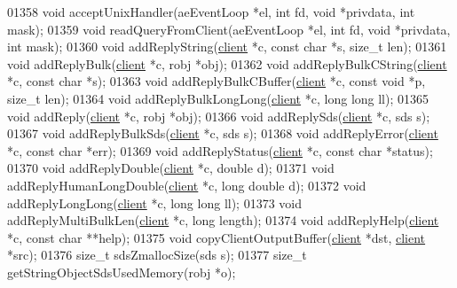 \begin{DoxyCode}
{{{{{{{01358 \textcolor{keywordtype}{void} acceptUnixHandler(aeEventLoop *el, \textcolor{keywordtype}{int} fd, \textcolor{keywordtype}{void} *privdata, \textcolor{keywordtype}{int} mask);
01359 \textcolor{keywordtype}{void} readQueryFromClient(aeEventLoop *el, \textcolor{keywordtype}{int} fd, \textcolor{keywordtype}{void} *privdata, \textcolor{keywordtype}{int} mask);
01360 \textcolor{keywordtype}{void} addReplyString(\hyperlink{structclient}{client} *c, \textcolor{keyword}{const} \textcolor{keywordtype}{char} *s, size\_t len);
01361 \textcolor{keywordtype}{void} addReplyBulk(\hyperlink{structclient}{client} *c, robj *obj);
01362 \textcolor{keywordtype}{void} addReplyBulkCString(\hyperlink{structclient}{client} *c, \textcolor{keyword}{const} \textcolor{keywordtype}{char} *s);
01363 \textcolor{keywordtype}{void} addReplyBulkCBuffer(\hyperlink{structclient}{client} *c, \textcolor{keyword}{const} \textcolor{keywordtype}{void} *p, size\_t len);
01364 \textcolor{keywordtype}{void} addReplyBulkLongLong(\hyperlink{structclient}{client} *c, \textcolor{keywordtype}{long} \textcolor{keywordtype}{long} ll);
01365 \textcolor{keywordtype}{void} addReply(\hyperlink{structclient}{client} *c, robj *obj);
01366 \textcolor{keywordtype}{void} addReplySds(\hyperlink{structclient}{client} *c, sds s);
01367 \textcolor{keywordtype}{void} addReplyBulkSds(\hyperlink{structclient}{client} *c, sds s);
01368 \textcolor{keywordtype}{void} addReplyError(\hyperlink{structclient}{client} *c, \textcolor{keyword}{const} \textcolor{keywordtype}{char} *err);
01369 \textcolor{keywordtype}{void} addReplyStatus(\hyperlink{structclient}{client} *c, \textcolor{keyword}{const} \textcolor{keywordtype}{char} *status);
01370 \textcolor{keywordtype}{void} addReplyDouble(\hyperlink{structclient}{client} *c, \textcolor{keywordtype}{double} d);
01371 \textcolor{keywordtype}{void} addReplyHumanLongDouble(\hyperlink{structclient}{client} *c, \textcolor{keywordtype}{long} \textcolor{keywordtype}{double} d);
01372 \textcolor{keywordtype}{void} addReplyLongLong(\hyperlink{structclient}{client} *c, \textcolor{keywordtype}{long} \textcolor{keywordtype}{long} ll);
01373 \textcolor{keywordtype}{void} addReplyMultiBulkLen(\hyperlink{structclient}{client} *c, \textcolor{keywordtype}{long} length);
01374 \textcolor{keywordtype}{void} addReplyHelp(\hyperlink{structclient}{client} *c, \textcolor{keyword}{const} \textcolor{keywordtype}{char} **help);
01375 \textcolor{keywordtype}{void} copyClientOutputBuffer(\hyperlink{structclient}{client} *dst, \hyperlink{structclient}{client} *src);
01376 size\_t sdsZmallocSize(sds s);
01377 size\_t getStringObjectSdsUsedMemory(robj *o);
}}}}}}}
\end{DoxyCode}

